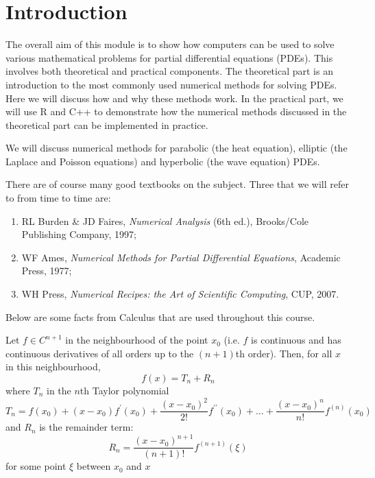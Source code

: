 %
%
%


\section{Introduction} \label{s:1}

The overall aim of this module is to show how computers
can be used to solve various mathematical problems for partial
differential equations (PDEs). This involves both theoretical and
practical components. The theoretical part is an introduction to
the most commonly used numerical methods for solving PDEs. Here we
will discuss how and why these methods work. In the practical
part, we will use R and C++ to demonstrate how the numerical methods
discussed in the theoretical part can be implemented in practice.

We will discuss numerical methods for
parabolic (the heat equation), elliptic (the Laplace and Poisson
equations) and hyperbolic (the wave equation) PDEs. 

There are of course many good textbooks on the subject. Three that we
will refer to from time to time are:
\begin{enumerate}

\item{} RL Burden \& JD Faires, {\it Numerical Analysis}
(6th ed.), Brooks/Cole Publishing Company, 1997;

\item{} WF Ames,
{\it Numerical Methods for Partial Differential Equations}, Academic
Press, 1977;

\item{} WH Press,
{\it Numerical Recipes: the Art of Scientific Computing}, CUP, 2007.

\end{enumerate}

Below are some facts from Calculus that are used throughout this course.

\begin{theorem}
Let $f\in C^{n+1}$ in the neighbourhood of the
point $x_{0}$ (i.e. $f$ is continuous and has continuous
derivatives of all orders up to the $(n+1)$th order). Then, for all
$x$ in this neighbourhood,
\[
f(x)=T_{n}+R_{n}
\]
where $T_{n}$ in the $n$th Taylor polynomial
\[
T_{n}=f(x_{0})+(x-x_{0})f^{\prime}(x_{0})+
\frac{(x-x_{0})^{2}}{2!}f^{\prime\prime}(x_{0})+ \dots+
\frac{(x-x_{0})^{n}}{n!}f^{(n)}(x_{0})
\]
and $R_{n}$ is the remainder term:
\[
R_{n}=\frac{(x-x_{0})^{n+1}}{(n+1)!}f^{(n+1)}(\xi)
\]
for some point $\xi$ between $x_{0}$ and $x$ 
\end{theorem}


